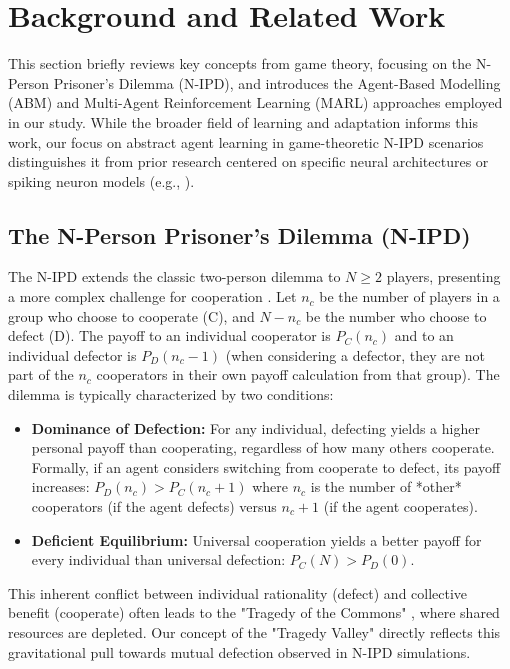 \documentclass[]{llncs} %
\begin{document}
\section{Background and Related Work}
\label{sec:litreview}

This section briefly reviews key concepts from game theory, focusing on the N-Person Prisoner's Dilemma (N-IPD), and introduces the Agent-Based Modelling (ABM) and Multi-Agent Reinforcement Learning (MARL) approaches employed in our study. While the broader field of learning and adaptation informs this work, our focus on abstract agent learning in game-theoretic N-IPD scenarios distinguishes it from prior research centered on specific neural architectures or spiking neuron models (e.g., \cite{Huyck, Huyck-Samey, HuyckErekpaine, Diehl}).

\subsection{The N-Person Prisoner's Dilemma (N-IPD)}
The N-IPD extends the classic two-person dilemma to $N \ge 2$ players, presenting a more complex challenge for cooperation \cite{Hamburger1973, Hardin1971}. %
Let $n_c$ be the number of players in a group who choose to cooperate (C), and $N-n_c$ be the number who choose to defect (D). The payoff to an individual cooperator is $P_C(n_c)$ and to an individual defector is $P_D(n_c-1)$ (when considering a defector, they are not part of the $n_c$ cooperators in their own payoff calculation from that group). The dilemma is typically characterized by two conditions:
\begin{itemize}
    \item \textbf{Dominance of Defection:} For any individual, defecting yields a higher personal payoff than cooperating, regardless of how many others cooperate. Formally, if an agent considers switching from cooperate to defect, its payoff increases: $P_D(n_c) > P_C(n_c+1)$ where $n_c$ is the number of *other* cooperators (if the agent defects) versus $n_c+1$ (if the agent cooperates).
    \item \textbf{Deficient Equilibrium:} Universal cooperation yields a better payoff for every individual than universal defection: $P_C(N) > P_D(0)$.
\end{itemize}
This inherent conflict between individual rationality (defect) and collective benefit (cooperate) often leads to the "Tragedy of the Commons" \cite{Hardin1968}, where shared resources are depleted. Our concept of the "Tragedy Valley" directly reflects this gravitational pull towards mutual defection observed in N-IPD simulations.
\end{document}
